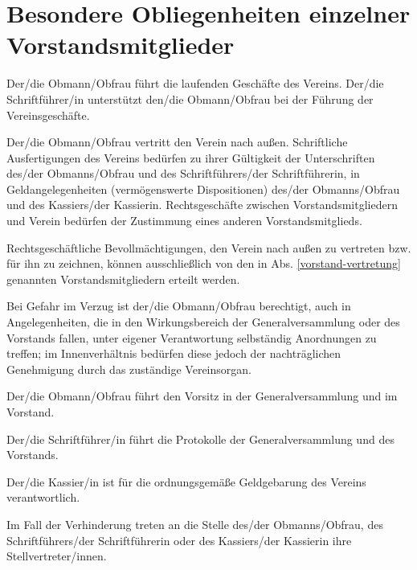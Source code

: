 \documentclass{article}
\begin{document}
\section{Besondere Obliegenheiten einzelner Vorstandsmitglieder}\label{vorstand-besonders}
\begin{absatz}
    \item Der/die Obmann/Obfrau führt die laufenden Geschäfte des Vereins. Der/die Schriftführer/in unterstützt den/die Obmann/Obfrau bei der Führung der Vereinsgeschäfte.
    \item \label{vorstand-vertretung} Der/die Obmann/Obfrau vertritt den Verein nach außen. Schriftliche Ausfertigungen des Vereins bedürfen zu ihrer Gültigkeit der Unterschriften des/der Obmanns/Obfrau und des Schriftführers/der Schriftführerin, in Geldangelegenheiten (vermögenswerte Dispositionen) des/der Obmanns/Obfrau und des Kassiers/der Kassierin. Rechtsgeschäfte zwischen Vorstandsmitgliedern und Verein bedürfen der Zustimmung eines anderen Vorstandsmitglieds.
    \item Rechtsgeschäftliche Bevollmächtigungen, den Verein nach außen zu vertreten bzw. für ihn zu zeichnen, können ausschließlich von den in Abs. \ref{vorstand-vertretung} genannten Vorstandsmitgliedern erteilt werden.
    \item Bei Gefahr im Verzug ist der/die Obmann/Obfrau berechtigt, auch in Angelegenheiten, die in den Wirkungsbereich der Generalversammlung oder des Vorstands fallen, unter eigener Verantwortung selbständig Anordnungen zu treffen; im Innenverhältnis bedürfen diese jedoch der nachträglichen Genehmigung durch das zuständige Vereinsorgan.
    \item Der/die Obmann/Obfrau führt den Vorsitz in der Generalversammlung und im Vorstand.
    \item Der/die Schriftführer/in führt die Protokolle der Generalversammlung und des Vorstands.
    \item Der/die Kassier/in ist für die ordnungsgemäße Geldgebarung des Vereins verantwortlich.
    \item Im Fall der Verhinderung treten an die Stelle des/der Obmanns/Obfrau, des Schriftführers/der Schriftführerin oder des Kassiers/der Kassierin ihre Stellvertreter/innen.
\end{absatz}
\end{document}
